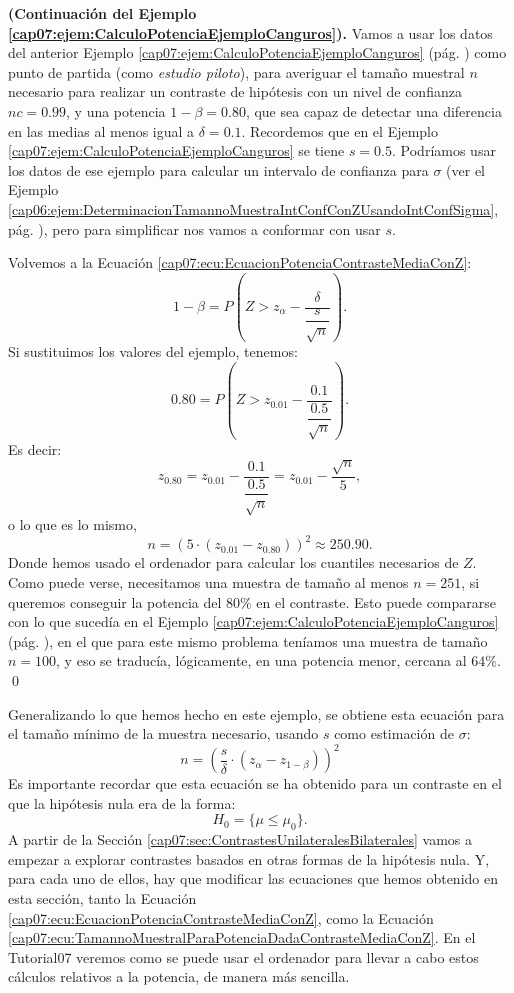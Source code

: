 \begin{ejemplo}{\bf (Continuación del Ejemplo \ref{cap07:ejem:CalculoPotenciaEjemploCanguros}).}
\label{cap07:ejem:CalculoPotenciaEjemploCanguros2}
Vamos a usar los datos del anterior Ejemplo \ref{cap07:ejem:CalculoPotenciaEjemploCanguros} (pág. \pageref{cap07:ejem:CalculoPotenciaEjemploCanguros}) como punto de partida (como {\em estudio piloto}), para averiguar el tamaño muestral $n$ necesario para realizar un contraste de hipótesis con un nivel de confianza $nc=0.99$, y una potencia $1-\beta=0.80$, que sea capaz de detectar una diferencia en las medias al menos igual a $\delta=0.1$. Recordemos que en el Ejemplo \ref{cap07:ejem:CalculoPotenciaEjemploCanguros} se tiene $s = 0.5$. Podríamos usar los datos de ese ejemplo para calcular un intervalo de confianza para $\sigma$ (ver el Ejemplo \ref{cap06:ejem:DeterminacionTamannoMuestraIntConfConZUsandoIntConfSigma}, pág. \pageref{cap06:ejem:DeterminacionTamannoMuestraIntConfConZUsandoIntConfSigma}), pero para simplificar nos vamos a conformar con usar $s$.

Volvemos a la Ecuación \ref{cap07:ecu:EcuacionPotenciaContrasteMediaConZ}:
\[1-\beta=P\left(Z> z_{\alpha}-\dfrac{\delta}{\dfrac{s}{\sqrt{n}}}\right).\]
Si sustituimos los valores del ejemplo, tenemos:
\[0.80 = P\left(Z> z_{0.01}-\dfrac{0.1}{\dfrac{0.5}{\sqrt{n}}}\right).\]
Es decir:
\[z_{0.80}=z_{0.01}-\dfrac{0.1}{\dfrac{0.5}{\sqrt{n}}}=z_{0.01}-\dfrac{\sqrt{n}}{5},\]
o lo que es lo mismo,
\[n =\left(5\cdot (z_{0.01}-z_{0.80})\right)^2 \approx 250.90. \]
Donde hemos usado el ordenador para calcular los cuantiles necesarios de $Z$. Como puede verse, necesitamos una muestra de tamaño al menos $n=251$, si queremos conseguir la potencia del $80\%$ en  el contraste.  Esto puede compararse con lo que sucedía en el Ejemplo \ref{cap07:ejem:CalculoPotenciaEjemploCanguros} (pág. \pageref{cap07:ejem:CalculoPotenciaEjemploCanguros}), en el que para este mismo problema teníamos una muestra de tamaño $n=100$, y eso se traducía, lógicamente, en una potencia menor, cercana al $64\%$.
\qed
\end{ejemplo}
Generalizando lo que hemos hecho en este ejemplo, se obtiene esta ecuación para el tamaño mínimo de la muestra necesario, usando $s$ como estimación de $\sigma$:
\begin{equation}
\label{cap07:ecu:TamannoMuestralParaPotenciaDadaContrasteMediaConZ}
n=\left(\dfrac{s}{\delta}\cdot(z_{\alpha}-z_{1-\beta})\right)^2
\end{equation}
Es importante recordar que esta ecuación se ha obtenido para un contraste en el que la hipótesis nula era de la forma:
\[H_0=\{\mu\leq \mu_0\}.\]
A partir de la Sección \ref{cap07:sec:ContrastesUnilateralesBilaterales} vamos a empezar a explorar contrastes basados en otras formas de la hipótesis nula. Y, para cada uno de ellos, hay que modificar las ecuaciones que hemos obtenido en esta sección, tanto la Ecuación \ref{cap07:ecu:EcuacionPotenciaContrasteMediaConZ}, como la Ecuación \ref{cap07:ecu:TamannoMuestralParaPotenciaDadaContrasteMediaConZ}. En el Tutorial07 veremos como se puede usar el ordenador para llevar a cabo estos cálculos relativos a la potencia, de manera más sencilla.


